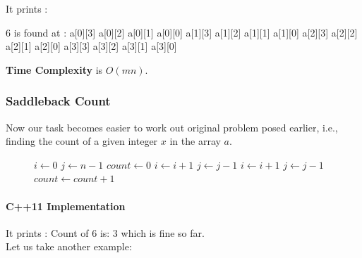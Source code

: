 

It prints :
\begin{boxedverbatim}
6 is found at : 
a[0][3]
a[0][2]
a[0][1]
a[0][0]
a[1][3]
a[1][2]
a[1][1]
a[1][0]
a[2][3]
a[2][2]
a[2][1]
a[2][0]
a[3][3]
a[3][2]
a[3][1]
a[3][0]
\end{boxedverbatim}  

\vspace{2mm}
\textbf{Time Complexity} is $O(mn)$.

\subsubsection{Saddleback Count}
Now our task becomes easier to work out original problem posed earlier, i.e., finding the count of a given integer $x$ in the array $a$. 

\begin{figure}[H]
\begin{center}
\end{center}
\begin{algorithmic}[1]
    \State $i \gets 0$
    \State $j \gets n - 1$
    \State $count \gets 0$
                \State $i \gets i + 1$
               \State $j \gets j - 1$
               \State $i \gets i + 1$
               \State $j \gets j - 1$
               \State $count \gets count + 1$
            \EndIf
        \EndWhile
\EndFunction
\end{algorithmic}
\end{figure}

\paragraph{C++11 Implementation}





It prints : Count of 6 is: 3 which is fine so far.
\vspace{1mm}\\
Let us take another example:


